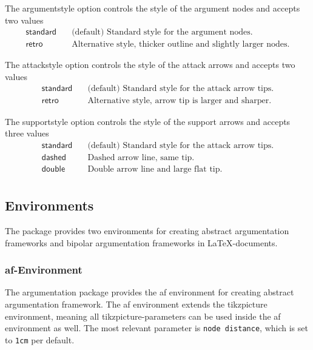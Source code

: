 \documentclass{article}
\begin{document}
    The \textsf{argumentstyle} option controls the style of the argument nodes and accepts two values
        \begin{align*}
            \mathsf{standard} &\quad \text{(default) Standard style for the argument nodes.}\\
            \mathsf{retro} &\quad \text{Alternative style, thicker outline and slightly larger nodes.}
        \end{align*}

    The \textsf{attackstyle} option controls the style of the attack arrows and accepts two values
    \begin{align*}
        \mathsf{standard} &\quad \text{(default) Standard style for the attack arrow tips.}\\
        \mathsf{retro} &\quad \text{Alternative style, arrow tip is larger and sharper.}
    \end{align*}

    The \textsf{supportstyle} option controls the style of the support arrows and accepts three values
    \begin{align*}
        \mathsf{standard} &\quad \text{(default) Standard style for the attack arrow tips.}\\
        \mathsf{dashed} &\quad \text{Dashed arrow line, same tip.}\\
        \mathsf{double} &\quad \text{Double arrow line and large flat tip.}\\
    \end{align*}
    

\subsection{Environments}
The package provides two environments for creating abstract argumentation frameworks and bipolar argumentation frameworks in \LaTeX-documents.

\subsubsection{\textsf{af}-Environment}
    The \textsf{argumentation} package provides the \textsf{af} environment for creating abstract argumentation framework.
    The \textsf{af} environment extends the \textsf{tikzpicture} environment, meaning all \textsf{tikzpicture}-parameters can be used inside the \textsf{af} environment as well.
    The most relevant parameter is \verb|node distance|, which is set to \verb|1cm| per default.
    
\end{document}
